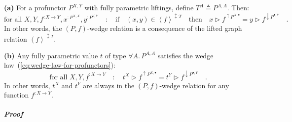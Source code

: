 \textbf{(a)} For a profunctor $P^{X,Y}$ with fully parametric liftings,
define $T^{A}\triangleq P^{A,A}$. Then:
\[
\text{for all }X,Y,f^{:X\rightarrow Y},x^{:P^{X,X}},y^{:P^{Y,Y}}\quad:\quad\text{if}\quad(x,y)\in\left<f\right>^{\updownarrow T}\quad\text{then}\quad x\triangleright f^{\uparrow P^{X,\bullet}}=y\triangleright f^{\downarrow P^{\bullet,Y}}\quad.
\]
In other words, the $\left(P,f\right)$-wedge relation is a consequence
of the lifted graph relation $\left<f\right>^{\updownarrow T}$.

\textbf{(b)} Any fully parametric value $t$ of type $\forall A.\,P^{A,A}$
satisfies the wedge law~(\ref{eq:wedge-law-for-profunctors}):
\[
\text{for all }X,Y,f^{:X\rightarrow Y}\quad:\quad t^{X}\triangleright f^{\uparrow P^{X,\bullet}}=t^{Y}\triangleright f^{\downarrow P^{\bullet,Y}}\quad.
\]
In other words, $t^{X}$ and $t^{Y}$ are always in the $(P,f)$-wedge
relation for any function $f^{:X\rightarrow Y}$.

\subparagraph{Proof}

